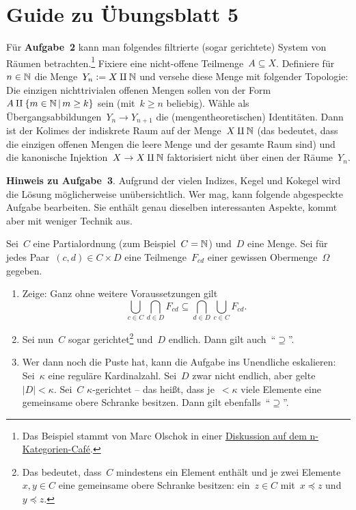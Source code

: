 \documentclass{uebblatt}
\begin{document}
\section*{Guide zu Übungsblatt 5}

Für \textbf{Aufgabe~2} kann man folgendes filtrierte (sogar gerichtete) System
von Räumen betrachten.\footnote{Das Beispiel stammt von Marc Olschok in einer
\href{https://golem.ph.utexas.edu/category/2009/05/journal_club_geometric_infinit_3.html\#c023818}{Diskussion
auf dem n-Kategorien-Café}.}
Fixiere eine nicht-offene Teilmenge~$A \subseteq X$. Definiere für~$n \in \mathbb{N}$ die Menge~$Y_n \vcentcolon= X \amalg
\mathbb{N}$ und versehe diese Menge mit folgender Topologie: Die einzigen
nichttrivialen offenen Mengen sollen von der Form~$A \amalg \{ m \in \mathbb{N} \,|\,
m \geq k \}$ sein (mit~$k \geq n$ beliebig). Wähle als
Übergangsabbildungen~$Y_n \to Y_{n+1}$ die (mengentheoretischen) Identitäten.
Dann ist der Kolimes der indiskrete Raum auf der Menge~$X
\amalg \mathbb{N}$ (das bedeutet, dass die einzigen offenen Mengen die leere Menge und
der gesamte Raum sind) und die kanonische Injektion~$X \to X \amalg \mathbb{N}$ faktorisiert
nicht über einen der Räume~$Y_n$.

\textbf{Hinweis zu Aufgabe~3}. Aufgrund der vielen Indizes, Kegel und Kokegel
wird die Lösung möglicherweise unübersichtlich. Wer mag, kann folgende
abgespeckte Aufgabe bearbeiten. Sie enthält genau dieselben interessanten
Aspekte, kommt aber mit weniger Technik aus.

Sei~$C$ eine Partialordnung (zum Beispiel~$C = \mathbb{N}$) und~$D$ eine Menge.
Sei für jedes Paar~$(c,d) \in C \times D$ eine Teilmenge~$F_{cd}$ einer
gewissen Obermenge~$\Omega$ gegeben.
\begin{enumerate}
\item Zeige: Ganz ohne weitere Voraussetzungen gilt
\[ \bigcup_{c \in C} \bigcap_{d \in D} F_{cd} \subseteq \bigcap_{d \in D} \bigcup_{c \in C} F_{cd}.
\]
\item Sei nun~$C$ sogar gerichtet\footnote{Das bedeutet, dass~$C$ mindestens
ein Element enthält und je zwei Elemente~$x,y \in C$ eine gemeinsame obere
Schranke besitzen: ein~$z \in C$ mit~$x \preceq z$ und~$y \preceq z$.} und~$D$
endlich. Dann gilt auch~"`$\supseteq$"'.
\item Wer dann noch die Puste hat, kann die Aufgabe ins Unendliche eskalieren:
Sei~$\kappa$ eine reguläre Kardinalzahl. Sei~$D$ zwar nicht endlich, aber
gelte~$|D| < \kappa$. Sei~$C$ $\kappa$-gerichtet -- das heißt, dass je~$<
\kappa$ viele Elemente eine gemeinsame obere Schranke besitzen. Dann gilt
ebenfalls~"`$\supseteq$"'.
\end{enumerate}
\end{document}
